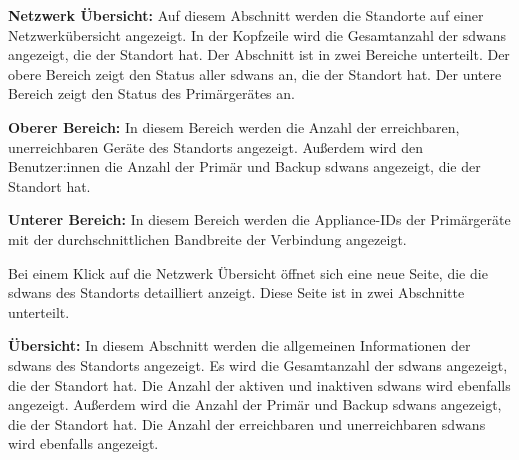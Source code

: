 \begin{compactitem}
\begin{compactitem}
\begin{compactitem}
\begin{compactitem}
            \end{compactitem}

            \item \textbf{Netzwerk Übersicht:} Auf diesem Abschnitt werden die Standorte auf einer Netzwerkübersicht angezeigt. 
            In der Kopfzeile wird die Gesamtanzahl der \gls{sdwan}s angezeigt, die der Standort hat.
            Der Abschnitt ist in zwei Bereiche unterteilt. Der obere Bereich zeigt den Status aller \gls{sdwan}s an, die der Standort hat. 
            Der untere Bereich zeigt den Status des Primärgerätes an.
            
            \begin{compactitem}
                \item \textbf{Oberer Bereich:} In diesem Bereich werden die Anzahl der erreichbaren, 
                unerreichbaren Geräte des Standorts angezeigt.
                Außerdem wird den Benutzer:innen die Anzahl der Primär und Backup \gls{sdwan}s angezeigt, die der Standort hat.
                \item \textbf{Unterer Bereich:} In diesem Bereich werden die Appliance-IDs der Primärgeräte
                mit der durchschnittlichen Bandbreite der Verbindung angezeigt.
            \end{compactitem}

            Bei einem Klick auf die Netzwerk Übersicht öffnet sich eine neue Seite, die die \gls{sdwan}s des Standorts detailliert anzeigt.
            Diese Seite ist in zwei Abschnitte unterteilt.

            \begin{compactitem}
                \item \textbf{Übersicht:} In diesem Abschnitt werden die allgemeinen Informationen der \gls{sdwan}s des Standorts angezeigt.
                Es wird die Gesamtanzahl der \gls{sdwan}s angezeigt, die der Standort hat.
                Die Anzahl der aktiven und inaktiven \gls{sdwan}s wird ebenfalls angezeigt.
                Außerdem wird die Anzahl der Primär und Backup \gls{sdwan}s angezeigt, die der Standort hat.
                Die Anzahl der erreichbaren und unerreichbaren \gls{sdwan}s wird ebenfalls angezeigt.


\end{compactitem}
\end{compactitem}
\end{compactitem}
\end{compactitem}

